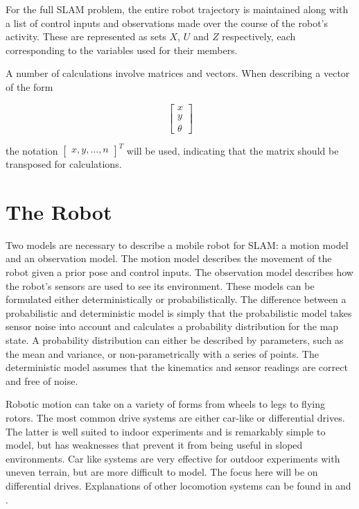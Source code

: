 For the full SLAM problem, the entire robot trajectory is maintained along with a list of control inputs and observations made over the course of the robot’s activity.  These are represented as sets $X$, $U$ and $Z$ respectively, each corresponding to the variables used for their members.   

A number of calculations involve matrices and vectors.  When describing a vector of the form

\[
\left[ {\begin{array}{cc}
 x \\
 y \\
\theta
\end{array} } \right]
\]

the notation $\left[ {\begin{array}{cc} x, y, \dots, n\end{array} }\right]^T$ will be used, indicating that the matrix should be transposed for calculations.  

\section{The Robot}

Two models are necessary to describe a mobile robot for SLAM:  a motion model and an observation model.  The motion model describes the movement of the robot given a prior pose and control inputs.  The observation model describes how the robot’s sensors are used to see its environment.  These models can be formulated either deterministically or probabilistically.  The difference between a probabilistic and deterministic model is simply that the probabilistic model takes sensor noise into account and calculates a probability distribution for the map state.  A probability distribution can either be described by parameters, such as the mean and variance, or non-parametrically with a series of points.  The deterministic model assumes that the kinematics and sensor readings are correct and free of noise.  

Robotic motion can take on a variety of forms from wheels to legs to flying rotors.  The most common drive systems are either car-like or differential drives.  The latter is well suited to indoor experiments and is remarkably simple to model, but has weaknesses that prevent it from being useful in sloped environments.  Car like systems are very effective for outdoor experiments with uneven terrain, but are more difficult to model.  The focus here will be on differential drives.  Explanations of other locomotion systems can be found in \cite{Dudek} and \cite{DBLP}.


